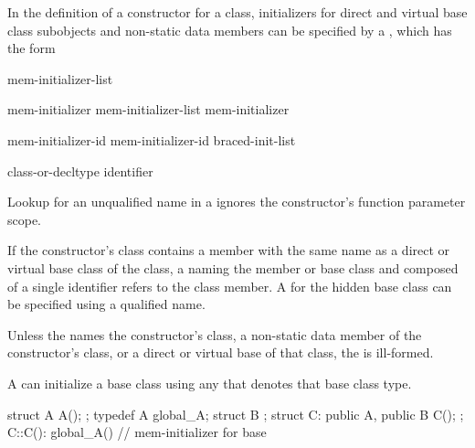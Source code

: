 \pnum
In the definition of a constructor for a class,
initializers for direct and virtual base class subobjects and
non-static data members can be specified by a
,
which has the form

\begin{bnf}
\br
    \terminal{:} mem-initializer-list
\end{bnf}

\begin{bnf}
\br
    mem-initializer \br
    mem-initializer-list \terminal{,} mem-initializer 
\end{bnf}

\begin{bnf}
\br
    mem-initializer-id \terminal{(}  \terminal{)}\br
    mem-initializer-id braced-init-list
\end{bnf}

\begin{bnf}
\br
    class-or-decltype\br
    identifier
\end{bnf}

\pnum
Lookup for an unqualified name in a 
ignores the constructor's function parameter scope.
\begin{note}
If the constructor's class contains a member with the same name as a direct
or virtual base class of the class, a
naming the member or base class and composed of a single identifier
refers to the class member.
A
for the hidden base class can be specified using a qualified name.
\end{note}
Unless the
names the constructor's class,
a non-static data member of the constructor's class, or
a direct or virtual base of that class,
the
is ill-formed.

\pnum
A
can initialize a base class using any  that denotes that base class type.
\begin{example}
\begin{codeblock}
struct A { A(); };
typedef A global_A;
struct B { };
struct C: public A, public B { C(); };
C::C(): global_A() { }          // mem-initializer for base 
\end{codeblock}
\end{example}

